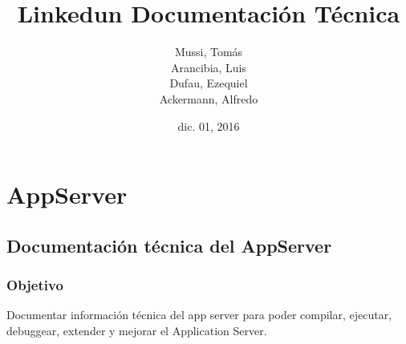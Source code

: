 \documentclass[a4paper,10pt,spanish]{sphinxmanual}
\title{Linkedun Documentación Técnica}
\date{dic. 01, 2016}
\author{Mussi, Tomás \\ Arancibia, Luis \\ Dufau, Ezequiel \\ Ackermann, Alfredo}
\begin{document}
\maketitle
\tableofcontents
{}\label{index::doc}



\chapter{AppServer}
\label{index:linkedun-manual-tecnico}\label{index:appserver}

\section{Documentación técnica del AppServer}
\label{appServer::doc}\label{appServer:documentacion-tecnica-del-appserver}

\subsection{Objetivo}
\label{docTecnica:objetivo}\label{docTecnica::doc}
Documentar información técnica del app server para poder compilar, ejecutar, debuggear, extender y mejorar el Application Server.
\end{document}
